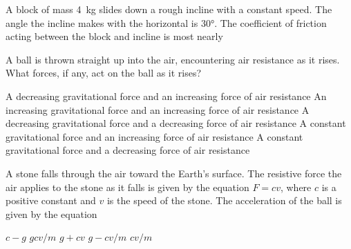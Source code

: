 \documentclass{../../../oss-apphys-exam}
\begin{document}
\begin{multicols*}{2}
\begin{questions}
    \question A block of mass \SI{4}{\kilo\gram} slides down a rough incline
    with a constant speed. The angle the incline makes with the horizontal is
    \ang{30}. The coefficient of friction acting between the block and incline
    is most nearly
    \begin{center}
    \end{center}
    \begin{choices}
    \end{choices}

    \question A ball is thrown straight up into the air, encountering air
    resistance as it rises. What forces, if any, act on the ball as it rises?
    \begin{choices}
      \choice A decreasing gravitational force and an increasing force of air
      resistance
      \choice An increasing gravitational force and an increasing force of air
      resistance
      \choice A decreasing gravitational force and a decreasing force of air
      resistance
      \choice A constant gravitational force and an increasing force of air
      resistance
      \choice A constant gravitational force and a decreasing force of air
      resistance
    \end{choices}
    
    \question A stone falls through the air toward the Earth's surface. The
    resistive force the air applies to the stone as it falls is given by the
    equation $F=cv$, where $c$ is a positive constant and $v$ is the speed of
    the stone. The acceleration of the ball is given by the equation
    \begin{choices}
      \choice $c-g$
      \choice $gcv/m$
      \choice $g+cv$
      \choice $g-cv/m$
      \choice $cv/m$
    \end{choices}
    \columnbreak
    

\end{questions}
\end{multicols*}
\end{document}
